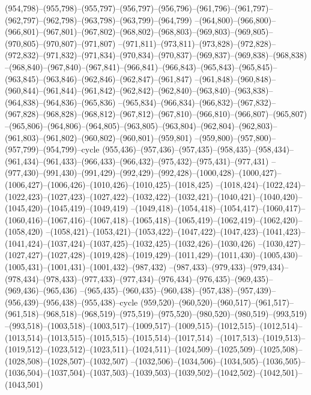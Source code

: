 (954,798)--(955,798)--(955,797)--(956,797)--(956,796)--(961,796)--(961,797)--(962,797)--(962,798)--(963,798)--(963,799)--(964,799)
--(964,800)--(966,800)--(966,801)--(967,801)--(967,802)--(968,802)--(968,803)--(969,803)--(969,805)--(970,805)--(970,807)--(971,807)
--(971,811)--(973,811)--(973,828)--(972,828)--(972,832)--(971,832)--(971,834)--(970,834)--(970,837)--(969,837)--(969,838)--(968,838)
--(968,840)--(967,840)--(967,841)--(966,841)--(966,843)--(965,843)--(965,845)--(963,845)--(963,846)--(962,846)--(962,847)--(961,847)
--(961,848)--(960,848)--(960,844)--(961,844)--(961,842)--(962,842)--(962,840)--(963,840)--(963,838)--(964,838)--(964,836)--(965,836)
--(965,834)--(966,834)--(966,832)--(967,832)--(967,828)--(968,828)--(968,812)--(967,812)--(967,810)--(966,810)--(966,807)--(965,807)
--(965,806)--(964,806)--(964,805)--(963,805)--(963,804)--(962,804)--(962,803)--(961,803)--(961,802)--(960,802)--(960,801)--(959,801)
--(959,800)--(957,800)--(957,799)--(954,799)--cycle
(955,436)--(957,436)--(957,435)--(958,435)--(958,434)--(961,434)--(961,433)--(966,433)--(966,432)--(975,432)--(975,431)--(977,431)
--(977,430)--(991,430)--(991,429)--(992,429)--(992,428)--(1000,428)--(1000,427)--(1006,427)--(1006,426)--(1010,426)--(1010,425)--(1018,425)
--(1018,424)--(1022,424)--(1022,423)--(1027,423)--(1027,422)--(1032,422)--(1032,421)--(1040,421)--(1040,420)--(1045,420)--(1045,419)--(1049,419)
--(1049,418)--(1054,418)--(1054,417)--(1060,417)--(1060,416)--(1067,416)--(1067,418)--(1065,418)--(1065,419)--(1062,419)--(1062,420)--(1058,420)
--(1058,421)--(1053,421)--(1053,422)--(1047,422)--(1047,423)--(1041,423)--(1041,424)--(1037,424)--(1037,425)--(1032,425)--(1032,426)--(1030,426)
--(1030,427)--(1027,427)--(1027,428)--(1019,428)--(1019,429)--(1011,429)--(1011,430)--(1005,430)--(1005,431)--(1001,431)--(1001,432)--(987,432)
--(987,433)--(979,433)--(979,434)--(978,434)--(978,433)--(977,433)--(977,434)--(976,434)--(976,435)--(969,435)--(969,436)--(965,436)
--(965,435)--(960,435)--(960,438)--(957,438)--(957,439)--(956,439)--(956,438)--(955,438)--cycle
(959,520)--(960,520)--(960,517)--(961,517)--(961,518)--(968,518)--(968,519)--(975,519)--(975,520)--(980,520)--(980,519)--(993,519)
--(993,518)--(1003,518)--(1003,517)--(1009,517)--(1009,515)--(1012,515)--(1012,514)--(1013,514)--(1013,515)--(1015,515)--(1015,514)--(1017,514)
--(1017,513)--(1019,513)--(1019,512)--(1023,512)--(1023,511)--(1024,511)--(1024,509)--(1025,509)--(1025,508)--(1028,508)--(1028,507)--(1032,507)
--(1032,506)--(1034,506)--(1034,505)--(1036,505)--(1036,504)--(1037,504)--(1037,503)--(1039,503)--(1039,502)--(1042,502)--(1042,501)--(1043,501)
